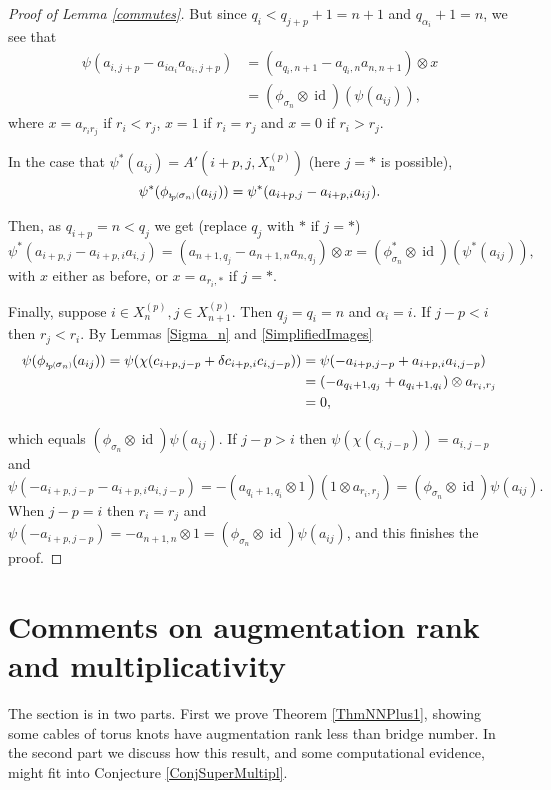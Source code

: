 \documentclass[11pt]{amsart}
\def\s{{\sigma}}
\def\a{\alpha}
\newcommand*{\subsmallp}[1]{\scalebox{.5}{\ensuremath#1}}
\newcommand{\subpp}[2][p]{\imath_{\hspace*{-1pt}#1}\hspace*{-.5pt}\subsmallp(#2\subsmallp)}
\newcommand\id{\operatorname{id}}
\theoremstyle{definition}
\begin{document}
\begin{proof} [Proof of Lemma \ref{commutes}]
\noindent But since $q_i<q_{j+p} + 1 = n+1$ and $q_{\a_i}+1=n$, we see that
\begin{align*}
\psi(a_{i,j+p} - a_{i\a_i}a_{\a_i,j+p}) &= (a_{q_i,n+1} - a_{q_i,n}a_{n,n+1})\otimes x\\
&= (\phi_{\s_n} \otimes \id)(\psi(a_{ij})),
\end{align*}
\noindent where $x=a_{r_ir_j}$ if $r_i<r_j$, $x=1$ if $r_i=r_j$ and $x=0$ if $r_i>r_j$.

In the case that $\psi^\ast(a_{ij}) = A'(i+p,j,X_n^{(p)})$ (here $j=\ast$ is possible),
$$\psi^\ast(\phi_{\subpp{\s_n}}(a_{ij})) = \psi^\ast(a_{i+p,j}-a_{i+p,i}a_{ij}).$$

\noindent Then, as $q_{i+p} = n<q_j$ we get (replace $q_j$ with $\ast$ if $j=\ast$)
$$\psi^\ast(a_{i+p,j} - a_{i+p,i}a_{i,j}) = (a_{n+1,q_j} - a_{n+1,n}a_{n,q_j})\otimes x = (\phi^\ast_{\s_n} \otimes \id)(\psi^\ast(a_{ij})),$$
\noindent with $x$ either as before, or $x=a_{r_i,\ast}$ if $j=\ast$.

Finally, suppose $i\in X_n^{(p)},j\in X_{n+1}^{(p)}$. Then $q_j=q_i=n$ and $\a_i=i$. If $j-p<i$ then $r_j<r_i$. By Lemmas \ref{Sigma_n} and \ref{SimplifiedImages}
\begin{align*}
  \psi(\phi_{\subpp{\s_n}}(a_{ij})) = \psi(\chi(c_{i+p,j-p}+\delta c_{i+p,i}c_{i,j-p}))
            &= \psi(-a_{i+p,j-p}+a_{i+p,i}a_{i,j-p})\\
            &= (-a_{q_i+1,q_j}+a_{q_i+1,q_i})\otimes a_{r_i,r_j}\\
            &=0,
\end{align*}

\noindent which equals $(\phi_{\s_n}\otimes\id)\psi(a_{ij})$. If $j-p>i$ then $\psi(\chi(c_{i,j-p}))=a_{i,j-p}$ and 
  \[\psi(-a_{i+p,j-p}-a_{i+p,i}a_{i,j-p}) = -(a_{q_i+1,q_i}\otimes 1)(1\otimes a_{r_i,r_j}) = (\phi_{\s_n}\otimes\id)\psi(a_{ij}).\]
\noindent When $j-p=i$ then $r_i=r_j$ and $\psi(-a_{i+p,j-p}) = -a_{n+1,n}\otimes 1=(\phi_{\s_n}\otimes\id)\psi(a_{ij})$, and this finishes the proof.
\end{proof}


\section{Comments on augmentation rank and multiplicativity}
\label{SecComments}

The section is in two parts. First we prove Theorem \ref{ThmNNPlus1}, showing some cables of torus knots have augmentation rank less than bridge number. In the second part we discuss how this result, and some computational evidence, might fit into Conjecture \ref{ConjSuperMultipl}.
\end{document}
